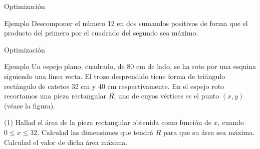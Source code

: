 \documentclass[8pt]{beamer}
\begin{document}
\begin{frame}[t]{Optimización}
\begin{exampleblock}{Ejemplo}
Descomponer el número 12 en dos sumandos positivos de forma que el producto
del primero por el cuadrado del segundo sea máximo.
\end{exampleblock}
\end{frame}

\begin{frame}[t]{Optimización}
\begin{exampleblock}{Ejemplo}
Un espejo plano, cuadrado, de 80 cm de lado, se ha roto por una esquina siguiendo una línea recta. El trozo desprendido tiene forma de triángulo rectángulo de catetos 32 cm y 40 cm respectivamente. En el espejo roto recortamos una pieza rectangular $R$, uno de cuyos vértices es el punto $(x,y)$ (véase la figura).
\begin{tasks}[label=\alph*)](1)
\task Hallad el área de la pieza rectangular obtenida como función de $x$, cuando \\ $0 \leq x \leq 32$.
\task Calculad las dimensiones que tendrá $R$ para que su área sea máxima. 
\task Calculad el valor de dicha área máxima.
\end{tasks}
\end{exampleblock}
\begin{center}
\end{center}
\end{frame}
\end{document}
